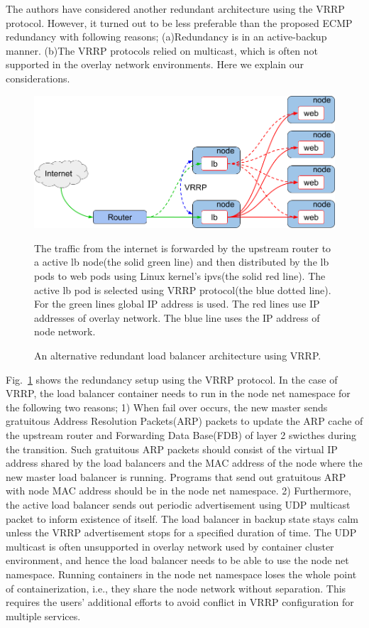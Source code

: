 The authors have considered another redundant architecture using the VRRP protocol.
However, it turned out to be less preferable than the proposed ECMP redundancy with following reasons;
(a)Redundancy is in an active-backup manner.
(b)The VRRP protocols relied on multicast, which is often not supported in the overlay network environments.
Here we explain our considerations.

\begin{figure}[h]
\begin{center}
\includegraphics[width=\columnwidth]{Figs/vrrp.png}
\end{center}
\caption{ An alternative redundant load balancer architecture using VRRP.}
  The traffic from the internet is forwarded by the upstream router to a active lb node(the solid green line) and then distributed by the lb pods to web pods using Linux kernel's ipvs(the solid red line).
  The active lb pod is selected using VRRP protocol(the blue dotted line).
  For the green lines global IP address is used. The red lines use IP addresses of overlay network. The blue line uses the IP address of node network.

\label{fig:vrrp}
\end{figure}

Fig.~\ref{fig:vrrp} shows the redundancy setup using the VRRP protocol.
In the case of VRRP, the load balancer container needs to run in the node net namespace for the following two reasons;
1) When fail over occurs, the new master sends gratuitous Address Resolution Packets(ARP) packets to update the ARP cache of the upstream router and Forwarding Data Base(FDB) of layer 2 swicthes during the transition.
Such gratuitous ARP packets should consist of the virtual IP address shared by the load balancers and the MAC address of the node where the new master load balancer is running.
Programs that send out gratuitous ARP with node MAC address should be in the node net namespace.
%
2) Furthermore, the active load balancer sends out periodic advertisement using UDP multicast packet to inform existence of itself.
The load balancer in backup state stays calm unless the VRRP advertisement stops for a specified duration of time.
The UDP multicast is often unsupported in overlay network used by container cluster environment, and hence the load balancer needs to be able to use the node net namespace.
%
Running containers in the node net namespace loses the whole point of containerization, i.e., they share the node network without separation.
This requires the users' additional efforts to avoid conflict in VRRP configuration for multiple services.
%

